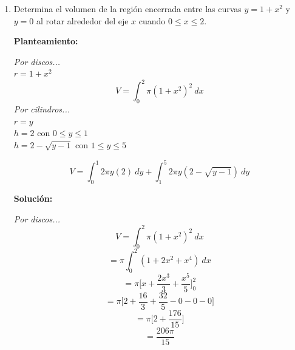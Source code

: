 \documentclass[10pt,letterpaper]{article}
\begin{document}
\begin{enumerate}
\item Determina el volumen de la región encerrada entre las curvas $y = 1 + x^2$ y $y = 0$ al rotar
      alrededor del eje $x$ cuando $0 \leq x \leq 2$.

\begin{multicols}{2}


\textbf{Planteamiento:}

\textit{Por discos...} \\
$r = 1+x^2$ \\
$$V = \int_{0}^{2} \pi (1+x^2)^2\ dx$$
\textit{Por cilindros...} \\
$r = y$ \\
$h = 2$ con $0 \leq y \leq 1$ \\
$h = 2 - \sqrt{y-1}$ con $1 \leq y \leq 5$

$$V = \int_{0}^{1} 2\pi y (2)\ dy + \int_{1}^{5} 2\pi y (2-\sqrt{y-1})\ dy$$

\textbf{Solución:}

\textit{Por discos...}
$$V = \int_{0}^{2} \pi (1+x^2)^2\ dx$$
$$= \pi \int_{0}^{2} (1 + 2x^2 + x^4)\ dx$$
$$= \pi \bigg[ x + \frac{2x^3}{3} + \frac{x^5}{5} \bigg]_{0}^{2}$$
$$= \pi \bigg[ 2 + \frac{16}{3} + \frac{32}{5} - 0 - 0 - 0 \bigg]$$
$$= \pi \bigg[ 2 + \frac{176}{15} \bigg]$$
$$= \frac{206\pi}{15}$$


\end{multicols}


\end{enumerate}
\end{document}
